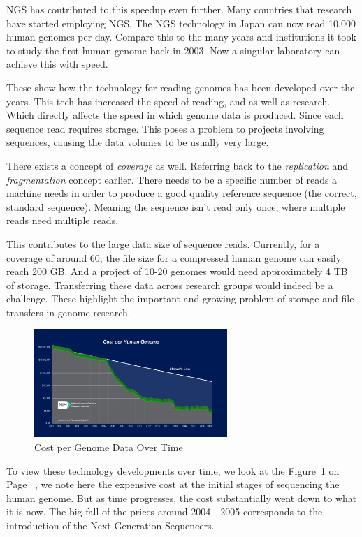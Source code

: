 \documentclass[acmsmall]{acmart}
\begin{document}
NGS has contributed to this speedup even further. Many countries that research have started employing NGS. The NGS technology in Japan can now read 10,000 human genomes per day. \cite[p.~19]{introgenomics} Compare this to the many years and institutions it took to study the first human genome back in 2003. Now a singular laboratory can achieve this with speed.

These show how the technology for reading genomes has been developed over the years. This tech has increased the speed of reading, and as well as research. Which directly affects the speed in which genome data is produced. Since each sequence read requires storage. This poses a problem to projects involving sequences, causing the data volumes to be usually very large\cite{bon_compression}. 

There exists a concept of \textit{coverage} as well. Referring back to the \textit{replication} and \textit{fragmentation} concept earlier. There needs to be a specific number of reads a machine needs in order to produce a good quality reference sequence (the correct, standard sequence). Meaning the sequence isn't read only once, where multiple reads need multiple reads.  

This contributes to the large data size of sequence reads. Currently, for a coverage of around 60, the file size for a compressed human genome can easily reach 200 GB. And a project of 10-20 genomes would need approximately 4 TB of storage. Transferring these data across research groups would indeed be a challenge. \cite[~p.68]{paulselzer2018} These highlight the important and growing problem of storage and file transfers in genome research.

\begin{figure}[h]
\centering
\includegraphics[width=0.65\textwidth]{images/human-gen-cost.jpg} 
\caption{Cost per Genome Data Over Time}
\label{fig:human_gen_cost_fig}
\end{figure}

To view these technology developments over time, we look at the Figure~\ref{fig:human_gen_cost_fig} on Page~\pageref{fig:human_gen_cost_fig} \cite{genomics-cost}, we note here the expensive cost at the initial stages of sequencing the human genome. But as time progresses, the cost substantially went down to what it is now. The big fall of the prices around 2004 - 2005 corresponds to the introduction of the Next Generation Sequencers.
\end{document}
